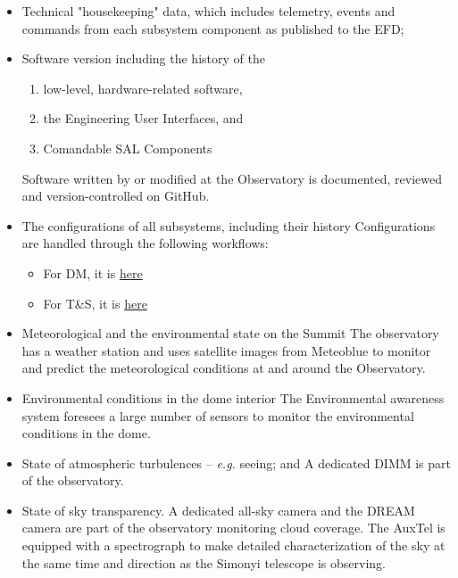 \begin{itemize}
	\item Technical "housekeeping" data, which includes telemetry, events and commands from each subsystem component as published to the EFD;
	
	\item Software version including the history of the 
	\begin{enumerate}
		\item low-level, hardware-related software, 
		\item the Engineering User Interfaces, and 
		\item Comandable SAL Components 
	\end{enumerate}
	Software written by or modified at the Observatory is documented, reviewed and version-controlled on GitHub. 
	\item The configurations of all subsystems, including their history
	Configurations are handled through the following workflows:
	\begin{itemize}
		\item For DM, it is \href{https://developer.lsst.io/work/flow.html}{here}
		\item For T\&S, it is \href{https://tssw-developer.lsst.io/work_management/development_workflow.html#development-workflow}{here}
	\end{itemize}

	\item Meteorological and the environmental state on the Summit
	The observatory has a weather station and uses satellite images from Meteoblue to monitor and predict the meteorological conditions at and around the Observatory.
	
	\item Environmental conditions in the dome interior
	The Environmental awareness system foresees a large number of sensors to monitor the environmental conditions in the dome.
	
	\item State of atmospheric turbulences -- {\it e.g.} seeing; and
	A dedicated DIMM is part of the observatory.
	
	\item State of sky transparency.
	A dedicated all-sky camera and the DREAM camera are part of the observatory monitoring cloud coverage. 
	The AuxTel is equipped with a spectrograph to make detailed characterization of the sky at the same time and direction as the Simonyi telescope is observing.
	
\end{itemize}

